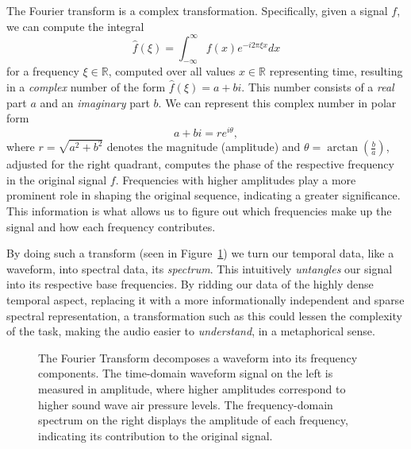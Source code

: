 The Fourier transform is a complex transformation. Specifically, given a signal $f$, we can compute the integral \[ \widehat{f}(\xi) = \int^{\infty}_{-\infty}{f(x)e^{-i2\pi \xi x} dx} \] for a frequency $\xi \in \mathbb{R}$, computed over all values $x \in \mathbb{R}$ representing time, resulting in a \textit{complex} number of the form $\widehat{f}(\xi) = a + bi$. This number consists of a \textit{real} part $a$ and an \textit{imaginary} part $b$. We can represent this complex number in polar form \[ a + bi = re^{i\theta}, \] where $r = \sqrt{a^2 + b^2}$ denotes the magnitude (amplitude) and $\theta = \arctan{(\frac{b}{a})}$, adjusted for the right quadrant, computes the phase of the respective frequency in the original signal $f$. Frequencies with higher amplitudes play a more prominent role in shaping the original sequence, indicating a greater significance. This information is what allows us to figure out which frequencies make up the signal and how each frequency contributes. 

By doing such a transform (seen in Figure~\ref{FTFigure}) we turn our temporal data, like a waveform, into spectral data, its \textit{spectrum}. This intuitively \textit{untangles} our signal into its respective base frequencies. By ridding our data of the highly dense temporal aspect, replacing it with a more informationally independent and sparse spectral representation, a transformation such as this could lessen the complexity of the task, making the audio easier to \textit{understand}, in a metaphorical sense.

\begin{figure}[H]
    \centering
    \hspace*{-1.3cm}
    \caption{The Fourier Transform decomposes a waveform into its frequency components. The time-domain waveform signal on the left is measured in amplitude, where higher amplitudes correspond to higher sound wave air pressure levels. The frequency-domain spectrum on the right displays the amplitude of each frequency, indicating its contribution to the original signal.}
    \label{FTFigure}
\end{figure}

